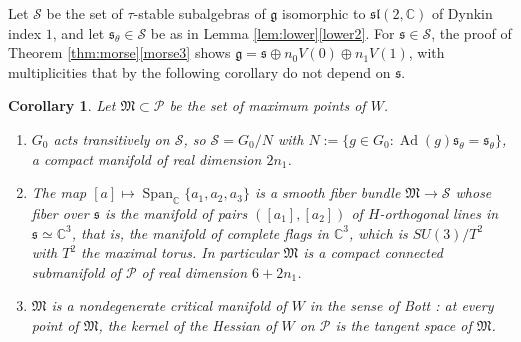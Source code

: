 \documentclass[leqno,10pt]{amsart}
\newtheorem{corollary}[theorem]{Corollary}%
\theoremstyle{definition}
\numberwithin{equation}{section}
\newcommand{\spn}{\operatorname{Span}}
\newcommand{\sll}{\mathfrak{sl}}
\newcommand{\g}{\mathfrak{g}}
\newcommand{\Ad}{\operatorname{Ad}}
\newcommand{\com}{\mathbb C}
\newcommand{\subs}{\mathfrak{s}}
\begin{document}
Let $\mathcal{S}$ be the set of $\tau$-stable subalgebras of $\g$ isomorphic to $\sll(2, \com)$ of Dynkin index $1$, and let $\subs_{\theta} \in \mathcal{S}$ be as in Lemma \ref{lem:lower}\ref{lower2}. For $\subs \in \mathcal{S}$, the proof of Theorem \ref{thm:morse}\ref{morse3} shows $\g = \subs \oplus n_{0}V(0) \oplus n_{1}V(1)$, with multiplicities that by the following corollary do not depend on $\subs$.
\begin{corollary}\label{cor:morsebott}
Let $\mathfrak{M} \subset \mathcal{P}$ be the set of maximum points of $W$.
\begin{enumerate}[label=(\arabic*), ref=(\arabic*)]
\item\label{mb1} $G_{0}$ acts transitively on $\mathcal{S}$, so $\mathcal{S} = G_{0}/N$ with $N := \{g \in G_{0}: \Ad(g)\subs_{\theta} = \subs_{\theta}\}$, a compact manifold of real dimension $2n_{1}$.
\item\label{mb2} The map $[a] \mapsto \spn_{\com}\{a_{1}, a_{2}, a_{3}\}$ is a smooth fiber bundle $\mathfrak{M} \to \mathcal{S}$ whose fiber over $\subs$ is the manifold of pairs $([a_{1}], [a_{2}])$ of $H$-orthogonal lines in $\subs \simeq \com^{3}$, that is, the manifold of complete flags in $\com^{3}$, which is $SU(3)/T^{2}$ with $T^{2}$ the maximal torus. In particular $\mathfrak{M}$ is a compact connected submanifold of $\mathcal{P}$ of real dimension $6 + 2n_{1}$.
\item\label{mb3} $\mathfrak{M}$ is a nondegenerate critical manifold of $W$ in the sense of Bott \cite{Bott-nondegenerate}: at every point of $\mathfrak{M}$, the kernel of the Hessian of $W$ on $\mathcal{P}$ is the tangent space of $\mathfrak{M}$.
\end{enumerate}
\end{corollary}
\end{document}
